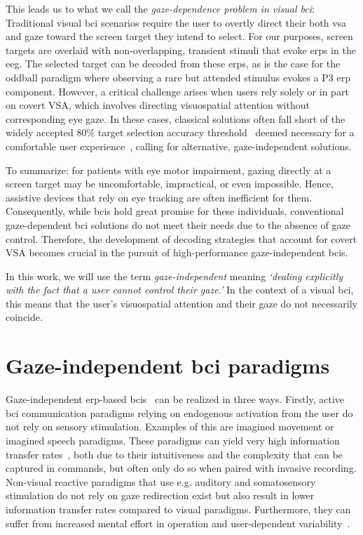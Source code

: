 This leads us to what we call the \emph{gaze-dependence problem in visual
\ac{bci}}:
Traditional visual \ac{bci} scenarios require the user to overtly direct their both
\ac{vsa} and gaze toward the screen target they intend to select.
For our purposes, screen targets are overlaid with non-overlapping, transient
stimuli that evoke \acp{erp} in the \ac{eeg}.
The selected target can be decoded from these \acp{erp}, as is the case for the
oddball paradigm where observing a rare but attended stimulus evokes a P3 \ac{erp}
component.
However, a critical challenge arises when users rely solely or in part on covert
VSA, which involves directing visuospatial attention without corresponding eye gaze.
In these cases, classical solutions often fall short of the widely accepted
80\% target selection accuracy threshold~\cite{Brunner2010,Frenzel2011,Treder2010,RonAngevin2019} deemed necessary for a comfortable user experience~\cite{Neeling2019}, calling for alternative, gaze-independent
solutions.

To summarize: for patients with eye motor impairment, gazing directly at a screen target may
be uncomfortable, impractical, or even impossible.
Hence, assistive devices that rely on eye tracking are often inefficient for
them.
Consequently, while \ac{bci}s hold great promise for these individuals, conventional
gaze-dependent \ac{bci} solutions do not meet their needs due to the absence of gaze
control.
Therefore, the development of decoding strategies that account for covert
VSA becomes crucial in the pursuit of high-performance gaze-independent
\ac{bci}s.

In this work, we will use the term \emph{gaze-independent} meaning
\emph{‘dealing explicitly with the fact that a user cannot control their
gaze.'}
In the context of a visual \ac{bci}, this means that the user's
visuospatial attention and their gaze do not necessarily coincide.



\section{Gaze-independent \ac{bci} paradigms}
\label{sec:gaze-independence}

Gaze-independent \ac{erp}-based \ac{bci}s~\cite{Riccio2012, Aloise2012} can be realized in three
ways.
Firstly, active \ac{bci} communication paradigms relying on endogenous activation from the user
do not rely on sensory stimulation.
Examples of this are imagined movement or imagined speech paradigms.
These paradigms can yield very high information transfer
rates~\cite{Willett2021,Metzger2023}, both due to their intuitiveness and the
complexity that can be captured in commands, but often only do so when paired
with invasive recording.
Non-visual reactive paradigms that use e.g. auditory and somatosensory
stimulation do not rely on gaze redirection exist but also result in lower information transfer
rates compared to visual paradigms.
Furthermore, they can suffer from increased mental effort in operation and
user-dependent variability~\cite{Severens2014,Reichert2020b}.

